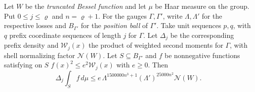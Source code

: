 \begin{lemma}
\label{lem:b-position-ball}
\emitthmsource
Let $W$ be the \emph{truncated Bessel function} and let $\mu$ be Haar measure on the group.
Put $0\le j\le\varrho$ and $n=\varrho+1$. For the gauges $\Gamma,\Gamma'$,
write $\Lambda,\Lambda'$ for the respective losses and $B_{\Gamma'}$ for the \emph{position ball} of $\Gamma'$.
Take unit sequences $p,q$, with $q$ prefix coordinate sequences of length $j$ for $\Gamma$.
Let $\Delta_j$ be the corresponding prefix density and $\mathcal W_j(x)$ the product of weighted second moments for $\Gamma$,
with shell normalizing factor $\mathcal N(W)$.
Let $S\subseteq B_{\Gamma'}$ and $f$ be nonnegative functions satisfying on $S$
$f(x)^2\le e^2\mathcal W_j(x)$ with $e\ge0$. Then
\[
 \Delta_j\int_S f\,d\mu
 \le e\,\Lambda^{1500000 n^3+1}(\Lambda')^{25000 n^2}\mathcal N(W).
\]
\end{lemma}
